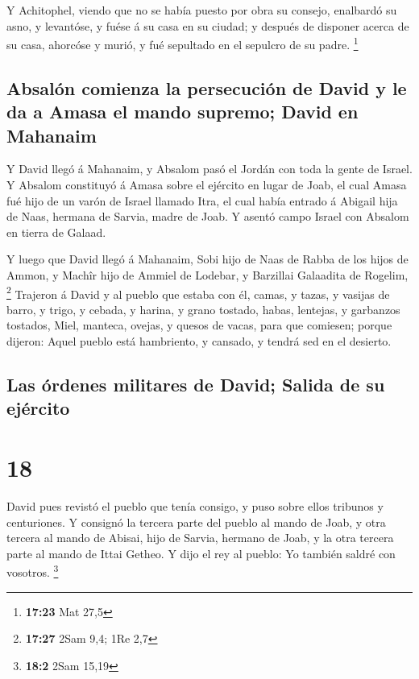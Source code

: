  Y Achitophel, viendo que no se había puesto por obra su
consejo, enalbardó su asno, y levantóse, y fuése á su casa en su ciudad;
y después de disponer acerca de su casa, ahorcóse y murió, y fué
sepultado en el sepulcro de su padre. \footnote{\textbf{17:23} Mat 27,5}

\hypertarget{absaluxf3n-comienza-la-persecuciuxf3n-de-david-y-le-da-a-amasa-el-mando-supremo-david-en-mahanaim}{%
\subsection{Absalón comienza la persecución de David y le da a Amasa el
mando supremo; David en
Mahanaim}\label{absaluxf3n-comienza-la-persecuciuxf3n-de-david-y-le-da-a-amasa-el-mando-supremo-david-en-mahanaim}}

 Y David llegó á Mahanaim, y Absalom pasó el Jordán con
toda la gente de Israel.  Y Absalom constituyó á Amasa
sobre el ejército en lugar de Joab, el cual Amasa fué hijo de un varón
de Israel llamado Itra, el cual había entrado á Abigail hija de Naas,
hermana de Sarvia, madre de Joab.  Y asentó campo Israel
con Absalom en tierra de Galaad.

 Y luego que David llegó á Mahanaim, Sobi hijo de Naas de
Rabba de los hijos de Ammon, y Machîr hijo de Ammiel de Lodebar, y
Barzillai Galaadita de Rogelim, \footnote{\textbf{17:27} 2Sam 9,4; 1Re
  2,7}  Trajeron á David y al pueblo que estaba con él,
camas, y tazas, y vasijas de barro, y trigo, y cebada, y harina, y grano
tostado, habas, lentejas, y garbanzos tostados,  Miel,
manteca, ovejas, y quesos de vacas, para que comiesen; porque dijeron:
Aquel pueblo está hambriento, y cansado, y tendrá sed en el desierto.

\hypertarget{las-uxf3rdenes-militares-de-david-salida-de-su-ejuxe9rcito}{%
\subsection{Las órdenes militares de David; Salida de su
ejército}\label{las-uxf3rdenes-militares-de-david-salida-de-su-ejuxe9rcito}}

\hypertarget{section-17}{%
\section{18}\label{section-17}}

 David pues revistó el pueblo que tenía consigo, y puso
sobre ellos tribunos y centuriones.  Y consignó la tercera
parte del pueblo al mando de Joab, y otra tercera al mando de Abisai,
hijo de Sarvia, hermano de Joab, y la otra tercera parte al mando de
Ittai Getheo. Y dijo el rey al pueblo: Yo también saldré con vosotros.
\footnote{\textbf{18:2} 2Sam 15,19}

